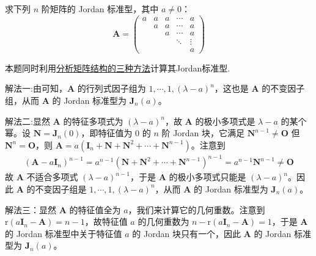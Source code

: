 \documentclass[../../main.tex]{subfiles}
\begin{document}
\begin{example}\label{example:元素全一样的上三角矩阵的Jordan标准型}
求下列 \(n\) 阶矩阵的 Jordan 标准型，其中 \(a \neq 0\)：
\[
\boldsymbol{A} = 
\begin{pmatrix}
a & a & a & \cdots & a \\
& a & a & \cdots & a \\
& & a & \cdots & a \\
& & & \ddots & \vdots \\
& & & & a
\end{pmatrix}
\]
\end{example}
\begin{remark}
本题同时利用\hyperlink{分析矩阵结构的方法}{分析矩阵结构的三种方法}计算其Jordan标准型.
\end{remark}
\begin{solution}
{\color{blue}解法一:}由可知，\(\boldsymbol{A}\) 的行列式因子组为 \(1, \cdots, 1, (\lambda - a)^n\)，这也是 \(\boldsymbol{A}\) 的不变因子组，从而 \(\boldsymbol{A}\) 的 Jordan 标准型为 \(\boldsymbol{J}_n(a)\)。

{\color{blue}解法二:}显然 \(\boldsymbol{A}\) 的特征多项式为 \((\lambda - a)^n\)，故 \(\boldsymbol{A}\) 的极小多项式是 \(\lambda - a\) 的某个幂。设 \(\boldsymbol{N} = \boldsymbol{J}_n(0)\)，即特征值为 \(0\) 的 \(n\) 阶 Jordan 块，它满足 \(\boldsymbol{N}^{n - 1} \neq \boldsymbol{O}\) 但 \(\boldsymbol{N}^n = \boldsymbol{O}\)，则 \(\boldsymbol{A} = a(\boldsymbol{I}_n + \boldsymbol{N} + \boldsymbol{N}^2 + \cdots + \boldsymbol{N}^{n - 1})\)。注意到
\begin{align*}
(\boldsymbol{A} - a\boldsymbol{I}_n)^{n - 1} = a^{n - 1}(\boldsymbol{N} + \boldsymbol{N}^2 + \cdots + \boldsymbol{N}^{n - 1})^{n - 1} = a^{n - 1}\boldsymbol{N}^{n - 1} \neq \boldsymbol{O}
\end{align*}
故 \(\boldsymbol{A}\) 不适合多项式 \((\lambda - a)^{n - 1}\)，于是 \(\boldsymbol{A}\) 的极小多项式只能是 \((\lambda - a)^n\)。因此 \(\boldsymbol{A}\) 的不变因子组是 \(1, \cdots, 1, (\lambda - a)^n\)，从而 \(\boldsymbol{A}\) 的 Jordan 标准型为 \(\boldsymbol{J}_n(a)\)。

{\color{blue}解法三：}显然 \(\boldsymbol{A}\) 的特征值全为 \(a\)，我们来计算它的几何重数。注意到 \(\mathrm{r}(a\boldsymbol{I}_n - \boldsymbol{A}) = n - 1\)，故特征值 \(a\) 的几何重数为 \(n - \mathrm{r}(a\boldsymbol{I}_n - \boldsymbol{A}) = 1\)，于是 \(\boldsymbol{A}\) 的 Jordan 标准型中关于特征值 \(a\) 的 Jordan 块只有一个，因此 \(\boldsymbol{A}\) 的 Jordan 标准型为 \(\boldsymbol{J}_n(a)\)。

\end{solution}
\end{document}
